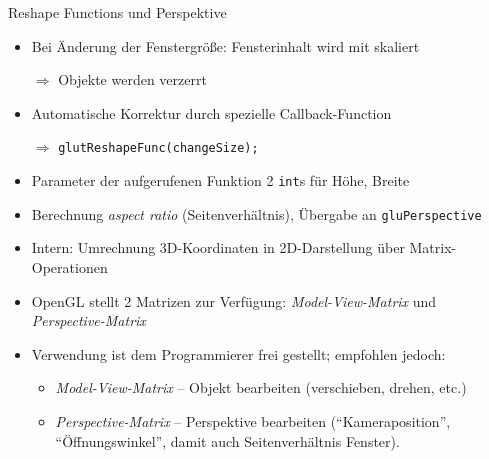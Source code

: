 
\begin{frame}{Reshape Functions und Perspektive}
%
\begin{itemize}
\item Bei Änderung der Fenstergröße: Fensterinhalt wird mit skaliert
\item[$\Rightarrow$] Objekte werden verzerrt
\item Automatische Korrektur durch spezielle Callback-Function
\item[$\Rightarrow$] \texttt{glutReshapeFunc(changeSize);}
\item Parameter der aufgerufenen Funktion 2 \texttt{int}s für Höhe, Breite
\item Berechnung \emph{aspect ratio} (Seitenverhältnis), Übergabe an \texttt{gluPerspective}
\item Intern: Umrechnung 3D-Koordinaten in 2D-Darstellung über Matrix-Operationen
\item OpenGL stellt 2 Matrizen zur Verfügung: \emph{Model-View-Matrix} und \emph{Perspective-Matrix}
\item Verwendung ist dem Programmierer frei gestellt; empfohlen jedoch:
	\begin{itemize}
	\item \emph{Model-View-Matrix} -- Objekt bearbeiten (verschieben, drehen, etc.)
	\item \emph{Perspective-Matrix} -- Perspektive bearbeiten (\enquote{Kameraposition},
		  \enquote{Öffnungswinkel}, damit auch Seitenverhältnis Fenster).
	\end{itemize}
\end{itemize}
%
\end{frame}


